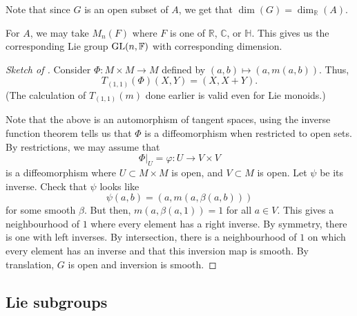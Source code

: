 \documentclass[12pt]{article}
\begin{document}
Note that since $G$ is an open subset of $A$, we get that $\dim(G) = \dim_{\mathbb{R}}(A)$.

\begin{ex} \label{ex:GL-examples}
	For $A$, we may take $M_{n}(F)$ where $F$ is one of $\mathbb{R}$, $\mathbb{C}$, or $\mathbb{H}$. \newline
	This gives us the corresponding Lie group $\operatorname{GL}(n, \mathbb{F})$ with corresponding dimension.
\end{ex}

\begin{proof}[Sketch of ]
	Consider $\Phi \colon M \times M \to M$ defined by $(a, b) \mapsto (a, m(a, b))$. \newline
	Thus,
	\begin{equation*} 
		T_{(1, 1)}(\Phi)(X, Y) = (X, X + Y).
	\end{equation*}
	(The calculation of $T_{(1, 1)}(m)$ done earlier is valid even for Lie monoids.)

	Note that the above is an automorphism of tangent spaces, using the inverse function theorem tells us that $\Phi$ is a diffeomorphism when restricted to open sets. By restrictions, we may assume that 
	\begin{equation*} 
		\Phi|_{U} = \varphi \colon U \to V \times V
	\end{equation*}
	is a diffeomorphism where $U \subset M \times M$ is open, and $V \subset M$ is open. \newline
	Let $\psi$ be its inverse. Check that $\psi$ looks like
	\begin{equation*} 
		\psi(a, b) = (a, m(a, \beta(a, b)))
	\end{equation*}
	for some smooth $\beta$. 
	But then, $m(a, \beta(a, 1)) = 1$ for all $a \in V$. 
	This gives a neighbourhood of $1$ where every element has a right inverse. 
	By symmetry, there is one with left inverses. 
	By intersection, there is a neighbourhood of $1$ on which every element has an inverse and that this inversion map is smooth. By translation, $G$ is open and inversion is smooth.
\end{proof}

\subsection{Lie subgroups}
\end{document}
